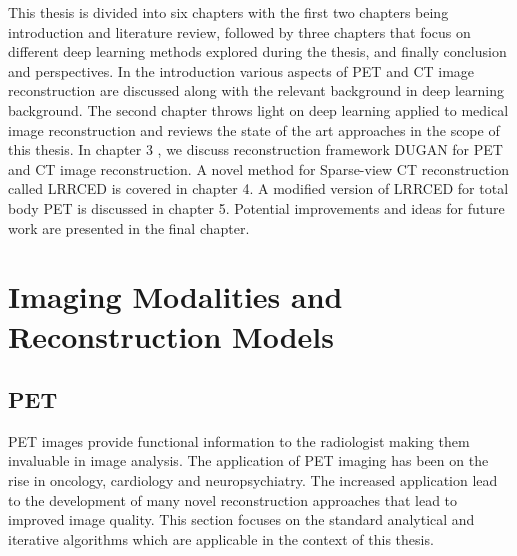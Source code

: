 This thesis is divided into six chapters with the first two chapters being introduction and literature review, followed by three chapters that focus on different deep learning methods explored during the thesis, and finally conclusion and perspectives. In the introduction various aspects of \ac{PET} and \ac{CT} image reconstruction are discussed along with the relevant background in deep learning background. The second chapter throws light on deep learning applied to medical image reconstruction and reviews the state of the art approaches in the scope of this thesis. 
In chapter 3 , we discuss reconstruction framework \ac{DUGAN} for \ac{PET} and \ac{CT} image reconstruction. A novel method for Sparse-view \ac{CT} reconstruction called \ac{LRRCED} is covered in chapter 4. A modified version of \ac{LRRCED} for total body \ac{PET} is discussed in chapter 5. Potential improvements and ideas for future work are presented in the final chapter. 


\section{Imaging Modalities and Reconstruction Models}


\subsection{PET}


\ac{PET} images provide functional information to the radiologist making them invaluable in image analysis. The application of \ac{PET} imaging has been on the rise in oncology, cardiology and neuropsychiatry. The increased application lead to the development of many novel reconstruction approaches that lead to improved image quality. This section focuses on the standard analytical and iterative algorithms which are applicable in the context of this thesis. 

